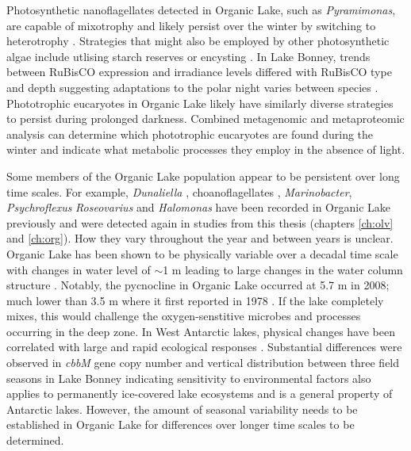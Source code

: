 Photosynthetic nanoflagellates detected in Organic Lake, such as \emph{Pyramimonas}, are capable of mixotrophy \cite{Bell2003} and likely persist over the winter by switching to heterotrophy \cite{Laybourn-Parry2005}.
Strategies that might also be employed by other photosynthetic algae include utlising starch reserves or encysting \cite{Laybourn-Parry2002}.
In Lake Bonney, trends between \acs{RuBisCO} expression and irradiance levels differed with \acs{RuBisCO} type and depth suggesting adaptations to the polar night varies between species \cite{Kong2012a}.
Phototrophic eucaryotes in Organic Lake likely have similarly diverse strategies to persist during prolonged darkness.
Combined metagenomic and metaproteomic analysis can determine which phototrophic eucaryotes are found during the winter and indicate what metabolic processes they employ in the absence of light.

Some members of the Organic Lake population appear to be persistent over long time scales.
For example, \emph{Dunaliella} \cite{Franzmann1987b}, choanoflagellates \cite{vandenHoff1986}, \emph{Marinobacter}, \emph{Psychroflexus} \emph{Roseovarius} and \emph{Halomonas} \cite{Bowman2000a} have been recorded in Organic Lake previously and were detected again in studies from this thesis (chapters \ref{ch:olv} and \ref{ch:org}).
How they vary throughout the year and between years is unclear.
Organic Lake has been shown to be physically variable over a decadal time scale with changes in water level of $\sim$1 m leading to large changes in the water column structure \cite{Gibson1995, Gibson1996}.
Notably, the pycnocline in Organic Lake occurred at 5.7 m in 2008; much lower than 3.5 m where it first reported in 1978 \cite{Franzmann1987b}.
If the lake completely mixes, this would challenge the oxygen-senstitive microbes and processes occurring in the deep zone.
In West Antarctic lakes, physical changes have been correlated with large and rapid ecological responses \cite{Quayle2002}.
Substantial differences were observed in \emph{cbbM} gene copy number and vertical distribution between three field seasons in Lake Bonney \cite{Kong2012b} indicating sensitivity to environmental factors also applies to permanently ice-covered lake ecosystems and is a general property of Antarctic lakes.
However, the amount of seasonal variability needs to be established in Organic Lake for differences over longer time scales to be determined.

